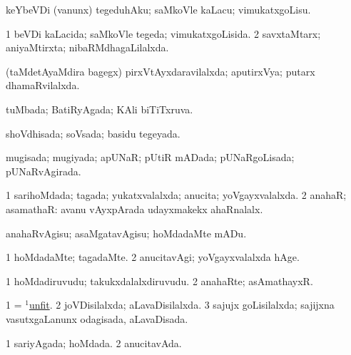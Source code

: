 \bentry
{} 
\gl{\sakirx}
\expl{}
\bmng
 keYbeVDi (\mo vanunx) tegeduhAku; saMkoVle kaLacu; vimukatxgoLisu. 
\emng
\eentry

\bentry
{} 
\gl{\gu}
\expl{}
\bmng
\bnum
\num{1} beVDi kaLacida; saMkoVle tegeda; vimukatxgoLisida. 
\num{2} savxtaMtarx; aniyaMtirxta; nibaRMdhagaLilalxda. 
\enum
\emng
\eentry

\bentry
{} 
\gl{\gu}
\expl{}
\bmng
 (taMdetAyaMdira bagegx) pirxVtAyxdaravilalxda; aputirxVya; putarx dhamaRvilalxda. 
\emng
\eentry

\bentry
{} 
\gl{\gu}
\expl{}
\bmng
 tuMbada; BatiRyAgada; KAli biTiTxruva. 
\emng
\eentry

\bentry
{} 
\gl{\gu}
\expl{}
\bmng
 shoVdhisada; soVsada; basidu tegeyada. 
\emng
\eentry

\bentry
{} 
\gl{\gu}
\expl{}
\bmng
mugisada; mugiyada; apUNaR; pUtiR mADada; pUNaRgoLisada; pUNaRvAgirada. 
\emng
\eentry

\bentry
{} 
\gl{\gu}
\expl{}
\bmng
\bnum
\num{1} sarihoMdada; tagada; yukatxvalalxda; anucita; yoVgayxvalalxda. 
\num{2} anahaR; asamathaR:  avanu vAyxpArada udayxmakekx ahaRnalalx. 
\enum
\emng
\eentry

\bentry
{} 
\gl{\sakirx}
\bmng
anahaRvAgisu; asaMgatavAgisu; hoMdadaMte mADu. 
\emng
\eentry

\bentry
{} 
\gl{\kirxvi}
\bmng
\bnum
\num{1} hoMdadaMte; tagadaMte. 
\num{2} anucitavAgi; yoVgayxvalalxda hAge. 
\enum
\emng
\eentry

\bentry
{} 
\gl{\nA}
\expl{}
\bmng
\bnum
\num{1} hoMdadiruvudu; takukxdalalxdiruvudu. 
\num{2} anahaRte; asAmathayxR. 
\enum
\emng
\eentry

\bentry
{} 
\gl{\gu} 
\bmng
\bnum
\num{1} = \hyperlink{unfit(1)}{$^1$unfit}. 
\num{2} joVDisilalxda; aLavaDisilalxda. 
\num{3} sajujx goLisilalxda; sajijxna vasutxgaLanunx odagisada, aLavaDisada. 
\enum
\emng
\eentry

\bentry
{} 
\gl{\gu}
\expl{}
\bmng
\bnum
\num{1} sariyAgada; hoMdada. 
\num{2} anucitavAda. 
\enum
\emng
\eentry

